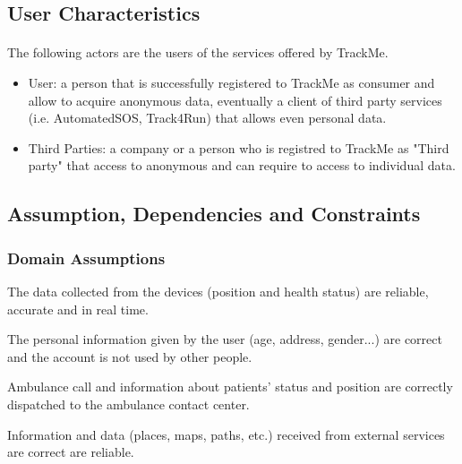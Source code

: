 \documentclass[a4paper]{article}
\begin{document}
    \subsection{User Characteristics}
    
    \paragraph{}The following actors are the users of the services offered by TrackMe. 
    
    
    \begin{itemize}
        \item User:  a person that is successfully registered to TrackMe as consumer and allow to acquire anonymous data, eventually a client of third party services (i.e. AutomatedSOS, Track4Run) that allows even personal data.
        
        \item Third Parties:  a company or a person who is registred to TrackMe as "Third party" that access to anonymous and can require to access to individual data.
        
    \end{itemize}
    
    \subsection{Assumption, Dependencies and Constraints}
    
    \subsubsection{Domain Assumptions}
    
    
    \begin{enumerate}[label={[D.\arabic*]}]
        
        \item The data collected from the devices (position and health status) are reliable, accurate and in real time.
        \item The personal information given by the user (age, address, gender...) are correct and the account is not used by other people. 
        \item Ambulance call and information about patients' status and position are correctly dispatched to the ambulance contact center.
        \item Information and data (places, maps, paths, etc.) received from external services are correct are reliable.
        
    \end{enumerate}
    
\end{document}
